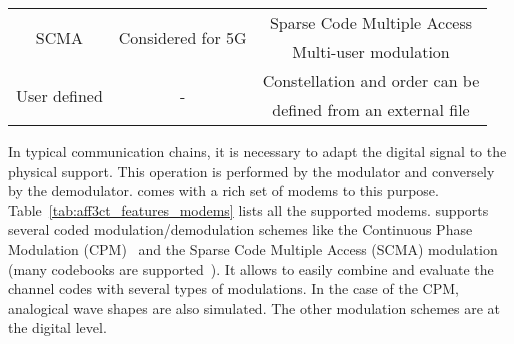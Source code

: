 \begin{table}[htp]
\begin{tabular}{ c | c | c }
  \hline
  \multirow{2}{*}{{SCMA}}         & \multirow{2}{*}{Considered for 5G} & Sparse Code Multiple Access            \\
                                  &                                    & Multi-user modulation                  \\
  \hline
  \multirow{2}{*}{{User defined}} & \multirow{2}{*}{-}                 & Constellation and order can be         \\
                                  &                                    & defined from an external file          \\
  \end{tabular}
\end{table}

In typical communication chains, it is necessary to adapt the digital signal
to the physical support. This operation is performed by the modulator and
conversely by the demodulator. \AFFECT comes with a rich set of modems to this
purpose. Table~\ref{tab:aff3ct_features_modems} lists all the supported modems.
\AFFECT supports several coded modulation/demodulation schemes like the
Continuous Phase Modulation (CPM)~\cite{Aulin1981a,Aulin1981b} and the Sparse
Code Multiple Access (SCMA) modulation~\cite{Nikopour2013,Ghaffari2017,
Ghaffari2019} (many codebooks are supported~\cite{AlteraSCMA,Wu2015,Cheng2015,
Zhang2016,Klimentyev2016,Song2017,Klimentyev2017}). It allows to easily combine
and evaluate the channel codes with several types of modulations. In the case of
the CPM, analogical wave shapes are also simulated. The other modulation schemes
are at the digital level.

